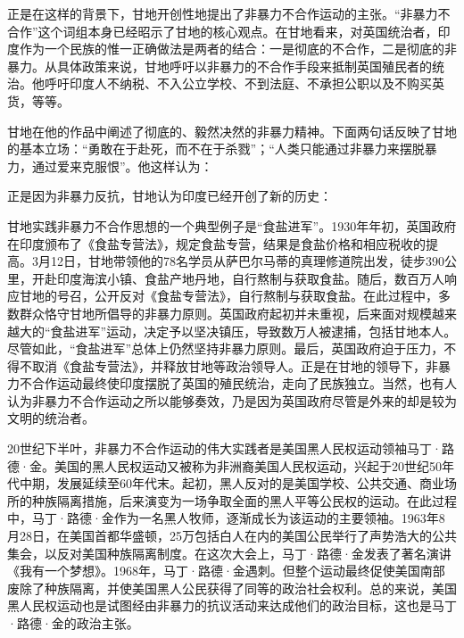 正是在这样的背景下，甘地开创性地提出了非暴力不合作运动的主张。“非暴力不合作”这个词组本身已经昭示了甘地的核心观点。在甘地看来，对英国统治者，印度作为一个民族的惟一正确做法是两者的结合：一是彻底的不合作，二是彻底的非暴力。从具体政策来说，甘地呼吁以非暴力的不合作手段来抵制英国殖民者的统治。他呼吁印度人不纳税、不入公立学校、不到法庭、不承担公职以及不购买英货，等等。

甘地在他的作品中阐述了彻底的、毅然决然的非暴力精神。下面两句话反映了甘地的基本立场：“勇敢在于赴死，而不在于杀戮”；“人类只能通过非暴力来摆脱暴力，通过爱来克服恨”。他这样认为：


正是因为非暴力反抗，甘地认为印度已经开创了新的历史：


甘地实践非暴力不合作思想的一个典型例子是“食盐进军”。1930年年初，英国政府在印度颁布了《食盐专营法》，规定食盐专营，结果是食盐价格和相应税收的提高。3月12日，甘地带领他的78名学员从萨巴尔马蒂的真理修道院出发，徒步390公里，开赴印度海滨小镇、食盐产地丹地，自行熬制与获取食盐。随后，数百万人响应甘地的号召，公开反对《食盐专营法》，自行熬制与获取食盐。在此过程中，多数群众恪守甘地所倡导的非暴力原则。英国政府起初并未重视，后来面对规模越来越大的“食盐进军”运动，决定予以坚决镇压，导致数万人被逮捕，包括甘地本人。尽管如此，“食盐进军”总体上仍然坚持非暴力原则。最后，英国政府迫于压力，不得不取消《食盐专营法》，并释放甘地等政治领导人。正是在甘地的领导下，非暴力不合作运动最终使印度摆脱了英国的殖民统治，走向了民族独立。当然，也有人认为非暴力不合作运动之所以能够奏效，乃是因为英国政府尽管是外来的却是较为文明的统治者。

20世纪下半叶，非暴力不合作运动的伟大实践者是美国黑人民权运动领袖马丁·路德·金。美国的黑人民权运动又被称为非洲裔美国人民权运动，兴起于20世纪50年代中期，发展延续至60年代末。起初，黑人反对的是美国学校、公共交通、商业场所的种族隔离措施，后来演变为一场争取全面的黑人平等公民权的运动。在此过程中，马丁·路德·金作为一名黑人牧师，逐渐成长为该运动的主要领袖。1963年8月28日，在美国首都华盛顿，25万包括白人在内的美国公民举行了声势浩大的公共集会，以反对美国种族隔离制度。在这次大会上，马丁·路德·金发表了著名演讲《我有一个梦想》。1968年，马丁·路德·金遇刺。但整个运动最终促使美国南部废除了种族隔离，并使美国黑人公民获得了同等的政治社会权利。总的来说，美国黑人民权运动也是试图经由非暴力的抗议活动来达成他们的政治目标，这也是马丁·路德·金的政治主张。

